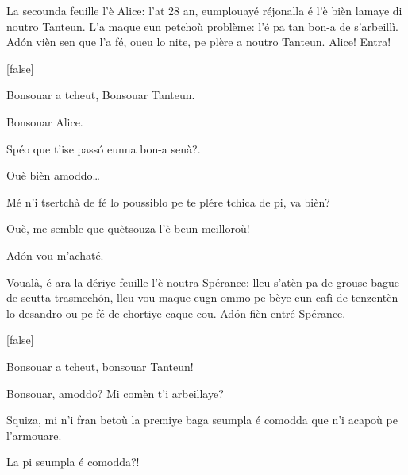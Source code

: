 \begin{drama}

\Mariespeaks La secounda feuille l'è Alice: l'at 28 an, eumplouayé réjonalla é l'è bièn lamaye di noutro Tanteun. L'a maque eun petchoù problème: l'é pa tan bon-a de s'arbeillì. Ad\'on vièn sen que l'a fé, oueu lo nite, pe plère a noutro Tanteun. Alice! Entra!

[false]%


\Alicespeaks {} Bonsouar a tcheut, Bonsouar Tanteun. 

\Tanteunspeaks Bonsouar Alice.

\Alicespeaks Spéo que t'ise pass\'o eunna bon-a senà?.

\Tanteunspeaks Ouè bièn amoddo\ldots

\Alicespeaks Mé n'i tsertchà de fé lo poussiblo pe te plére tchica de pi, va bièn?

\Tanteunspeaks{} Ouè, me semble que quètsouza l'è beun meilloroù!

\Alicespeaks Ad\'on vou m'achaté.


\Mariespeaks{} Voualà, é ara la dériye feuille l'è noutra Spérance: lleu s'atèn pa de grouse bague de seutta trasmech\'on,  lleu vou maque eugn ommo pe bèye eun cafì de tenzentèn lo desandro ou pe fé de chortiye caque cou. Ad\'on fièn entré Spérance.

[false]%


\Sperancespeaks Bonsouar a tcheut, bonsouar Tanteun!

\Tanteunspeaks{} Bonsouar, amoddo? Mi comèn t'i ar\-be\-illaye?

\Sperancespeaks Squiza, mi n'i fran betoù la premiye baga seumpla é comodda que n'i acapoù pe l'armouare.

\Tanteunspeaks La pi seumpla é comodda?!


\end{drama}
